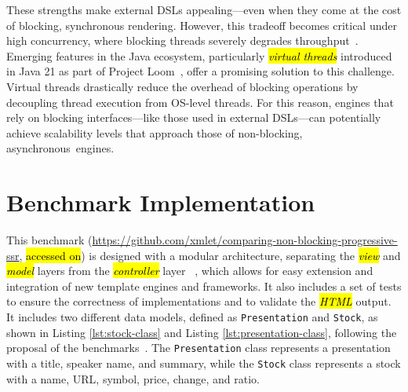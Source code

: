 \documentclass[software,article,accept,pdftex,moreauthors]{Definitions/mdpi}
\begin{document}
These strengths make external DSLs appealing---even when they come at the cost of
blocking, synchronous rendering. However, this tradeoff becomes critical under
high concurrency, where blocking threads severely degrades throughput~\cite{wise2024pssr}.
Emerging features in the Java ecosystem, particularly \textit{\hl{virtual threads}}
introduced in Java 21 as part of Project Loom~\cite{Veen2024}, offer a promising solution to
this challenge. Virtual threads drastically reduce the overhead of blocking
operations by decoupling thread execution from OS-level threads. For this reason,
engines that rely on blocking interfaces---like those used in
external DSLs---can potentially achieve scalability levels that approach those of
non-blocking, asynchronous~engines.




\section{Benchmark Implementation}
\label{sec:bench}

This benchmark ({\url{https://github.com/xmlet/comparing-non-blocking-progressive-ssr}}, \hl{accessed on})
is designed with a modular architecture, separating the \textit{\hl{view}} and
\textit{\hl{model}} layers from the \textit{\hl{controller}} layer ~\cite{Bucanek2009},
which allows for easy extension and integration of new template engines and
frameworks. It also includes a set of tests to ensure the correctness of
implementations and to validate the \textit{\hl{HTML}} output. It includes two
different data models, defined as \texttt{Presentation} and \texttt{Stock}, as
shown in Listing \ref{lst:stock-class} and Listing \ref{lst:presentation-class},
following the proposal of the
benchmarks~\cite{templatesbenchmark,springbenchmark}. The \texttt{Presentation}
class represents a presentation with a title, speaker name, and summary, while
the \texttt{Stock} class represents a stock with a name, URL, symbol, price,
change, and ratio.
\end{document}
